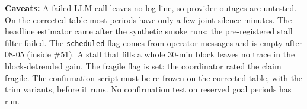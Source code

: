 \textbf{Caveats:}
A failed LLM call leaves no log line, so provider outages are untested.
On the corrected table most periods have only a few joint-silence minutes.
The headline estimator came after the synthetic smoke runs; the pre-registered stall filter failed.
The \texttt{scheduled} flag comes from operator messages and is empty after 08-05 (inside \#51).
A stall that fills a whole 30-min block leaves no trace in the block-detrended gain.
The fragile flag is set: the coordinator rated the claim fragile.
The confirmation script must be re-frozen on the corrected table, with the trim variants, before it runs.
No confirmation test on reserved goal periods has run.
